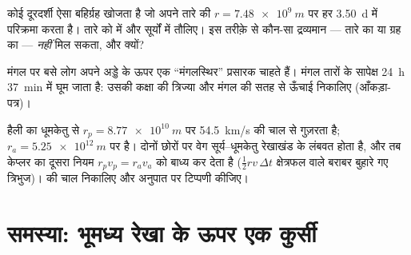 \begin{exercise}[$\star\star\star$]\label{exo:g12:satellites-kepler:13}
कोई दूरदर्शी ऐसा बहिर्ग्रह खोजता है जो अपने तारे की $r = \qty{7.48e9}{m}$ पर हर \qty{3.50}{d} में
परिक्रमा करता है। तारे को  में और सूर्यों में तौलिए। इस
तरीक़े से कौन-सा द्रव्यमान --- तारे का या ग्रह का --- \emph{नहीं} मिल सकता, और
क्यों?
\end{exercise}

\begin{exercise}[$\star\star\star$]\label{exo:g12:satellites-kepler:14}
मंगल पर बसे लोग अपने अड्डे के ऊपर एक ``मंगलस्थिर'' प्रसारक चाहते हैं। मंगल
तारों के सापेक्ष \qty{24}{h} \qty{37}{min} में घूम जाता है: उसकी कक्षा की
त्रिज्या और मंगल की सतह से ऊँचाई निकालिए (आँकड़ा-पत्र)।
\end{exercise}

\begin{exercise}[$\star\star\star$]\label{exo:g12:satellites-kepler:15}
हैली का धूमकेतु  से $r_p = \qty{8.77e10}{m}$ पर \qty{54.5}{km/s} की चाल से गुज़रता है;
 $r_a = \qty{5.25e12}{m}$ पर है। दोनों छोरों पर वेग सूर्य--धूमकेतु रेखाखंड के
लंबवत होता है, और तब केप्लर का दूसरा नियम $r_p v_p = r_a v_a$ को बाध्य कर देता है
($\tfrac12 r v\,\Delta t$ क्षेत्रफल वाले बराबर बुहारे गए त्रिभुज)।  की
चाल निकालिए और अनुपात पर टिप्पणी कीजिए।
\end{exercise}

\section{समस्या: भूमध्य रेखा के ऊपर एक कुर्सी}

